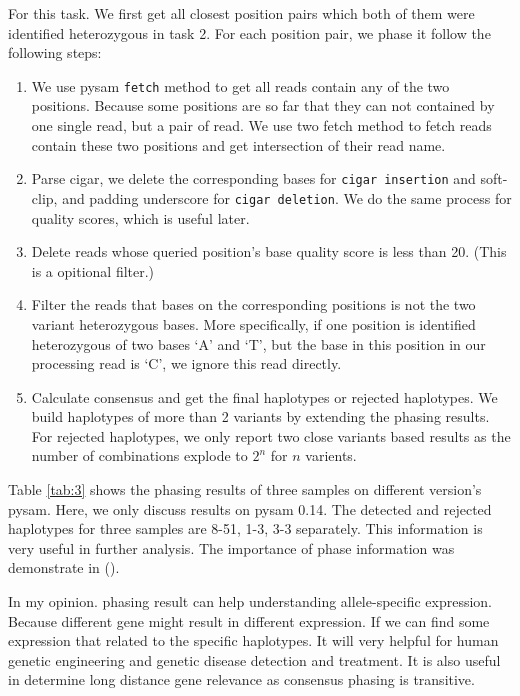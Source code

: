 \documentclass[a4paper]{article}
\begin{document}
For this task. We first get all closest position pairs which both of them were identified heterozygous in task 2. For each position pair, we phase it follow the following steps: 
\begin{enumerate}

\item We use pysam \texttt{fetch} method to get all reads contain any of the two positions. Because some positions are so far that they can not contained by one single read, but a pair of read. We use two fetch method to fetch reads contain these two positions and get intersection of their read name. 

\item Parse cigar, we delete the corresponding bases for \texttt{cigar insertion} and soft-clip, and padding underscore for \texttt{cigar deletion}. We do the same process for quality scores, which is useful later.

\item Delete reads whose queried position's base quality score is less than 20. (This is a opitional filter.)

\item Filter the reads that bases on the corresponding positions is not the two variant heterozygous bases. More specifically, if one position is identified heterozygous of two bases `A' and `T', but the base in this position in our processing read is `C', we ignore this read directly. 

\item Calculate consensus and get the final haplotypes or rejected haplotypes. We build haplotypes of more than 2 variants by extending the phasing results. For rejected haplotypes, we only report two close variants based results as the number of combinations explode to $2^n$ for $n$ varients.

\end{enumerate}

Table \ref{tab:3} shows the phasing results of three samples on different version's pysam. Here, we only discuss results on pysam 0.14. The detected and rejected haplotypes for three samples are 8-51, 1-3, 3-3 separately. This information is very useful in further analysis. The importance of phase information was demonstrate in (\cite{Important2011}). 

In my opinion. phasing result can help understanding allele-specific expression. Because different gene might result in different expression. If we can find some expression that related to the specific haplotypes. It will very helpful for human genetic engineering and genetic disease detection and treatment. It is also useful in determine long distance gene relevance as consensus phasing is transitive. 
\end{document}
